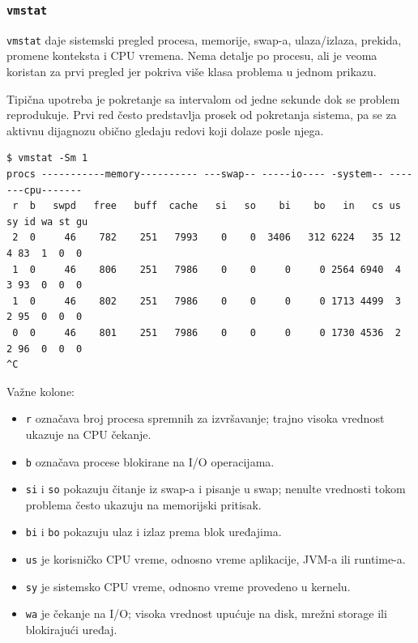 \subsubsection{\texorpdfstring{\texttt{vmstat}}{vmstat}}\label{vmstat}

\texttt{vmstat} daje sistemski pregled procesa, memorije, swap-a, ulaza/izlaza, prekida, promene konteksta i CPU vremena. Nema detalje po procesu, ali je veoma koristan za prvi pregled jer pokriva više klasa problema u jednom prikazu.

Tipična upotreba je pokretanje sa intervalom od jedne sekunde dok se problem reprodukuje. Prvi red često predstavlja prosek od pokretanja sistema, pa se za aktivnu dijagnozu obično gledaju redovi koji dolaze posle njega.

\begin{verbatim}
$ vmstat -Sm 1
procs -----------memory---------- ---swap-- -----io---- -system-- -------cpu-------
 r  b   swpd   free   buff  cache   si   so    bi    bo   in   cs us sy id wa st gu
 2  0     46    782    251   7993    0    0  3406   312 6224   35 12  4 83  1  0  0
 1  0     46    806    251   7986    0    0     0     0 2564 6940  4  3 93  0  0  0
 1  0     46    802    251   7986    0    0     0     0 1713 4499  3  2 95  0  0  0
 0  0     46    801    251   7986    0    0     0     0 1730 4536  2  2 96  0  0  0
^C
\end{verbatim}

Važne kolone:

\begin{itemize}
\tightlist
\item
  \texttt{r} označava broj procesa spremnih za izvršavanje; trajno visoka vrednost ukazuje na CPU čekanje.
\item
  \texttt{b} označava procese blokirane na I/O operacijama.
\item
  \texttt{si} i \texttt{so} pokazuju čitanje iz swap-a i pisanje u swap; nenulte vrednosti tokom problema često ukazuju na memorijski pritisak.
\item
  \texttt{bi} i \texttt{bo} pokazuju ulaz i izlaz prema blok uređajima.
\item
  \texttt{us} je korisničko CPU vreme, odnosno vreme aplikacije, JVM-a ili runtime-a.
\item
  \texttt{sy} je sistemsko CPU vreme, odnosno vreme provedeno u kernelu.
\item
  \texttt{wa} je čekanje na I/O; visoka vrednost upućuje na disk, mrežni storage ili blokirajući uređaj.
\end{itemize}

